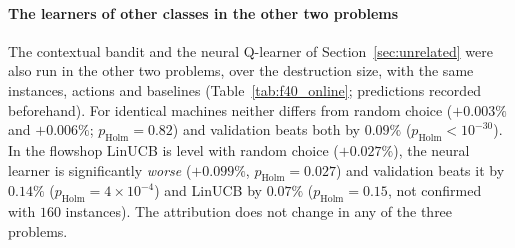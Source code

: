 

\paragraph{The learners of other classes in the other two problems}
The contextual bandit and the neural Q-learner of Section~\ref{sec:unrelated} were also run in the other two problems, over the destruction size, with the same instances, actions and baselines (Table~\ref{tab:f40_online}; predictions recorded beforehand). For identical machines neither differs from random choice
($+0.003\%$ and $+0.006\%$; $p_{\mathrm{Holm}}=0.82$) and validation beats both by $0.09\%$ ($p_{\mathrm{Holm}}<10^{-30}$). In the flowshop LinUCB is level with random choice ($+0.027\%$), the neural learner is significantly \emph{worse} ($+0.099\%$, $p_{\mathrm{Holm}}=0.027$) and validation
beats it by $0.14\%$ ($p_{\mathrm{Holm}}=4\times10^{-4}$) and LinUCB by $0.07\%$ ($p_{\mathrm{Holm}}=0.15$, not confirmed with $160$ instances). The attribution does not change in any of the three problems.


